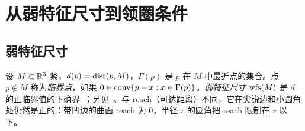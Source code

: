 \section{从弱特征尺寸到领圈条件}\label{sec:collar}

\subsection{弱特征尺寸}
设 $M\subset\mathbb{R}^3$ 紧，$d(p)=\operatorname{dist}(p,M)$，$\Gamma(p)$ 是 $p$ 在 $M$ 中最近点的集合。点 $p\notin M$ 称为\emph{临界点}，如果 $0\in\operatorname{conv}\{p-x:x\in\Gamma(p)\}$。\emph{弱特征尺寸} $\operatorname{wfs}(M)$ 是 $d$ 的正临界值的下确界~\cite[\S2.2]{CCSL09dcg}；另见~\cite{ChazalLieutier07}。与 reach（可达距离）不同，它在尖锐边和小圆角处仍然是正的：带凹边的曲面 reach 为 $0$，半径 $r$ 的圆角把 reach 限制在 $r$ 以下。

